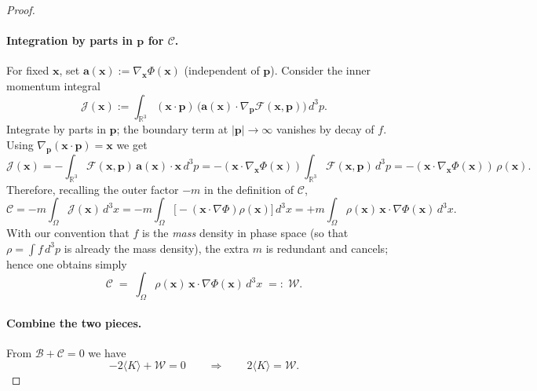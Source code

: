 \documentclass[10pt,a4paper]{amsart}
\begin{document}
\begin{proof}
\paragraph{Integration by parts in \(\mathbf{p}\) for \(\mathscr{C}\).}
For fixed \(\mathbf{x}\), set \(\mathbf{a}(\mathbf{x}):=\nabla_{\mathbf{x}}\Phi(\mathbf{x})\) (independent of \(\mathbf{p}\)). Consider the inner momentum integral
\begin{equation}
\mathscr{J}(\mathbf{x}) := \int_{\mathbb{R}^3} (\mathbf{x}\!\cdot\!\mathbf{p})\,\big(\mathbf{a}(\mathbf{x})\!\cdot\!\nabla_{\mathbf{p}} \mathcal{F}(\mathbf{x},\mathbf{p})\big)\,d^3p.
\end{equation}
Integrate by parts in \(\mathbf{p}\); the boundary term at $|\mathbf{p}|\to\infty$ vanishes by decay of \(f\). Using \(\nabla_{\mathbf{p}}(\mathbf{x}\!\cdot\!\mathbf{p})=\mathbf{x}\) we get
\begin{equation}
\mathscr{J}(\mathbf{x}) = -\int_{\mathbb{R}^3} \mathcal{F}(\mathbf{x},\mathbf{p})\,\mathbf{a}(\mathbf{x})\!\cdot\!\mathbf{x}\,d^3p
= -(\mathbf{x}\!\cdot\!\nabla_{\mathbf{x}}\Phi(\mathbf{x}))\int_{\mathbb{R}^3} \mathcal{F}(\mathbf{x},\mathbf{p})\,d^3p
= -(\mathbf{x}\!\cdot\!\nabla_{\mathbf{x}}\Phi(\mathbf{x}))\,\rho(\mathbf{x}).
\end{equation}
Therefore, recalling the outer factor \(-m\) in the definition of \(\mathscr{C}\),
\begin{equation}
\mathscr{C} = -m\int_{\Omega} \mathscr{J}(\mathbf{x})\,d^3x
= -m\int_{\Omega} \big[-(\mathbf{x}\!\cdot\!\nabla\Phi)\rho(\mathbf{x})\big]\,d^3x
= +m\int_{\Omega} \rho(\mathbf{x})\,\mathbf{x}\!\cdot\!\nabla\Phi(\mathbf{x})\,d^3x.
\end{equation}
With our convention that $f$ is the \emph{mass} density in phase space (so that $\rho=\int f\,d^3p$ is already the mass density), the extra $m$ is redundant and cancels; hence one obtains simply
\begin{equation}
\mathscr{C} \;=\; \int_{\Omega} \rho(\mathbf{x})\,\mathbf{x}\!\cdot\!\nabla\Phi(\mathbf{x})\,d^3x \;=: \; \mathcal{W}.
\end{equation}

\paragraph{Combine the two pieces.}
From \(\mathscr{B}+\mathscr{C}=0\) we have
\begin{equation}
-2\langle {K}\rangle + \mathcal{W} = 0 \qquad\Longrightarrow\qquad 2\langle {K}\rangle = \mathcal{W}.
\label{eq:virial_intermediate}
\end{equation}


\end{proof}
\end{document}
